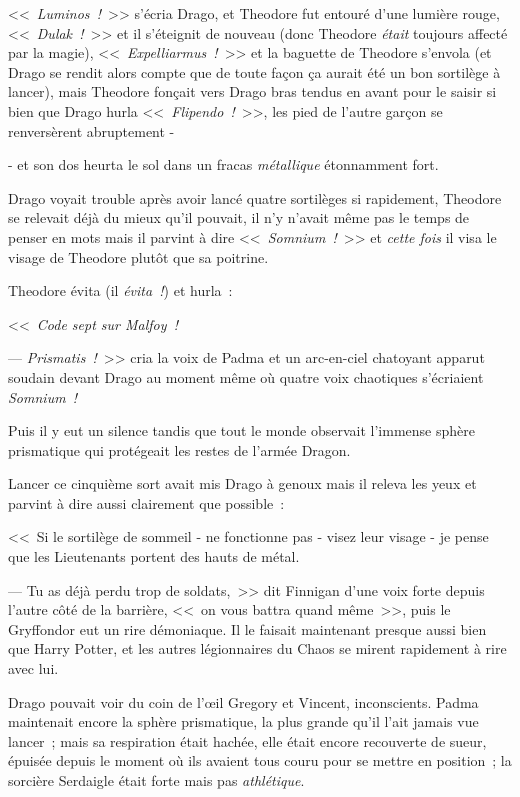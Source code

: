 <<~\emph{Luminos~!}~>> s'écria Drago, et Theodore fut entouré d'une lumière rouge, <<~\emph{Dulak~!}~>> et il s'éteignit de nouveau (donc Theodore \emph{était} toujours affecté par la magie), <<~\emph{Expelliarmus~!}~>> et la baguette de Theodore s'envola (et Drago se rendit alors compte que de toute façon ça aurait été un bon sortilège à lancer), mais Theodore fonçait vers Drago bras tendus en avant pour le saisir si bien que Drago hurla <<~\emph{Flipendo~!}~>>, les pied de l'autre garçon se renversèrent abruptement -

- et son dos heurta le sol dans un fracas \emph{métallique} étonnamment fort.

Drago voyait trouble après avoir lancé quatre sortilèges si rapidement, Theodore se relevait déjà du mieux qu'il pouvait, il n'y n'avait même pas le temps de penser en mots mais il parvint à dire <<~\emph{Somnium~!}~>> et \emph{cette fois} il visa le visage de Theodore plutôt que sa poitrine.

Theodore évita (il \emph{évita~!}) et hurla~:

<<~\emph{Code sept sur Malfoy~!}

--- \emph{Prismatis~!}~>> cria la voix de Padma et un arc-en-ciel chatoyant apparut soudain devant Drago au moment même où quatre voix chaotiques s'écriaient \emph{Somnium~!}

Puis il y eut un silence tandis que tout le monde observait l'immense sphère prismatique qui protégeait les restes de l'armée Dragon.

Lancer ce cinquième sort avait mis Drago à genoux mais il releva les yeux et parvint à dire aussi clairement que possible~:

<<~Si le sortilège de sommeil - ne fonctionne pas - visez leur visage - je pense que les Lieutenants portent des hauts de métal.

--- Tu as déjà perdu trop de soldats,~>> dit Finnigan d'une voix forte depuis l'autre côté de la barrière, <<~on vous battra quand même~>>, puis le Gryffondor eut un rire démoniaque. Il le faisait maintenant presque aussi bien que Harry Potter, et les autres légionnaires du Chaos se mirent rapidement à rire avec lui.

Drago pouvait voir du coin de l'œil Gregory et Vincent, inconscients. Padma maintenait encore la sphère prismatique, la plus grande qu'il l'ait jamais vue lancer~; mais sa respiration était hachée, elle était encore recouverte de sueur, épuisée depuis le moment où ils avaient tous couru pour se mettre en position~; la sorcière Serdaigle était forte mais pas \emph{athlétique}.

